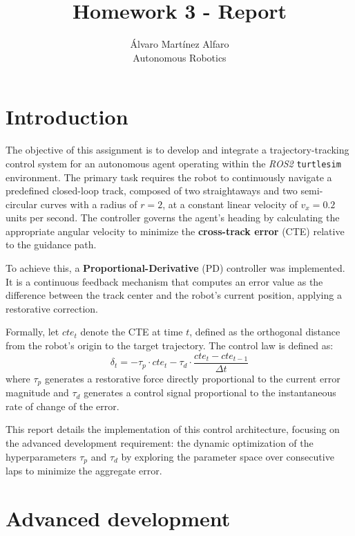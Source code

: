 \documentclass[12pt]{article}
\begin{document}
\title{Homework 3 - Report}
\author{Álvaro Martínez Alfaro\\
    Autonomous Robotics}

\maketitle

\section{Introduction}

The objective of this assignment is to develop and integrate a trajectory-tracking control system for
an autonomous agent operating within the \textit{ROS2} \texttt{turtlesim} environment. The primary
task requires the robot to continuously navigate a predefined closed-loop track, composed of two
straightaways and two semi-circular curves with a radius of $r = 2$, at a constant linear velocity
of $v_x=0.2$ units per second. The controller governs the agent's heading by calculating the
appropriate angular velocity to minimize the \textbf{cross-track error} (CTE) relative to the
guidance path.

To achieve this, a \textbf{Proportional-Derivative} (PD) controller was implemented. It is a
continuous feedback mechanism that computes an error value as the difference between the track
center and the robot's current position, applying a restorative correction.

Formally, let $cte_t$ denote the CTE at time $t$, defined as the orthogonal distance from the robot's
origin to the target trajectory. The control law is defined as:
\begin{equation}
    \delta_t = -\tau_p \cdot cte_t - \tau_d \cdot \frac{cte_t-cte_{t-1}}{\Delta t}
\end{equation}
where $\tau_p$ generates a restorative force directly proportional to the current error magnitude
and $\tau_d$ generates a control signal proportional to the instantaneous rate of change of the
error.

This report details the implementation of this control architecture, focusing on the advanced
development requirement: the dynamic optimization of the hyperparameters $\tau_p$ and $\tau_d$ by
exploring the parameter space over consecutive laps to minimize the aggregate error.


\section{Advanced development}
\end{document}
